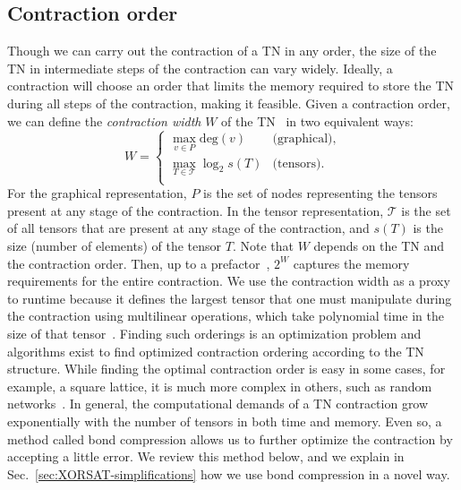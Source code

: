 \subsection{Contraction order}\label{sec:contraction-ordering}
Though we can carry out the contraction of a TN in any order, the size of the TN in intermediate steps of the contraction can vary widely.
Ideally, a contraction will choose an order that limits the memory required to store the TN during all steps of the contraction, making it feasible.
Given a contraction order, we can define the \emph{contraction width} $W$ of the TN~\cite{gray_hyper-optimized_2021} in two equivalent ways:
\begin{equation} \label{eq:contraction-width}
    W =
    \begin{cases}
        \max_{v \in P} \mathrm{deg}(v) & \text{(graphical)},\\
        \max_{T \in \mathcal{T}} \log_2{s(T)} & \text{(tensors)}.\\
    \end{cases}
\end{equation}
For the graphical representation, $P$ is the set of nodes representing the tensors present at any stage of the contraction.
In the tensor representation, $\mathcal{T}$ is the set of all tensors that are present at any stage of the contraction, and $s(T)$ is the size (number of elements) of the tensor $T$.
Note that $W$ depends on the TN and the contraction order.
Then, up to a prefactor~\cite{gray_hyper-optimized_2021}, $2^W$ captures the memory requirements for the entire contraction.
We use the contraction width as a proxy to runtime because it defines the largest tensor that one must manipulate during the contraction using multilinear operations, which take polynomial time in the size of that tensor~\cite{gray_hyper-optimized_2021}.
Finding such orderings is an optimization problem and algorithms exist to find optimized contraction ordering according to the TN structure.
While finding the optimal contraction order is easy in some cases, for example, a square lattice, it is much more complex in others, such as random networks~\cite{gray_hyper-optimized_2022}.
In general, the computational demands of a TN contraction grow exponentially with the number of tensors in both time and memory.
Even so, a method called bond compression allows us to further optimize the contraction by accepting a little error.
We review this method below, and we explain in Sec.~\ref{sec:XORSAT-simplifications} how we use bond compression in a novel way.

